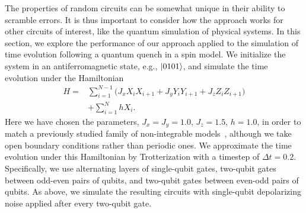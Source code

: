 \documentclass[
amsmath,
amssymb,
aps,
pra,
reprint,
twocolumn,
superscriptaddress,
longbibliography,
showkeys,
floatfix
]{revtex4-1}
\def\ket#1{\ensuremath{\mathinner{|{#1}\rangle}}}
\begin{document}
The properties of random circuits can be somewhat unique in their ability to
scramble errors.  It is thus important to consider how the approach
works for other circuits of interest, like the quantum simulation of physical systems.
In this section, we explore the performance of our approach applied to the
simulation of time evolution following a quantum quench in a spin model.
We initialize the system in an antiferromagnetic state, e.g., \(\ket{0101}\), and
simulate the time evolution under the Hamiltonian
\begin{align}
  H =& \sum_{i=1}^{N-1} \Big( J_x X_iX_{i+1} + J_y Y_iY_{i+1} + J_z Z_iZ_{i+1}\Big) \\ &+ \sum_{i=1}^{N} h X_i.
                                                                                                                    \nonumber
\end{align}
Here we have chosen the parameters, \(J_x = J_y = 1.0\), \(J_z = 1.5\), \(h =
1.0\), in order to match a previously studied family of non-integrable
models~\cite{Dmitriev2004-de}, although we take open boundary conditions rather
than periodic ones.
We approximate the time evolution under this Hamiltonian by Trotterization with
a timestep of \(\Delta t = 0.2\). 
Specifically, we use alternating layers of single-qubit gates, two-qubit gates
between odd-even pairs of qubits, and two-qubit gates between even-odd pairs of
qubits. 
As above, we simulate the resulting circuits with single-qubit depolarizing
noise applied after every two-qubit gate.
\end{document}
